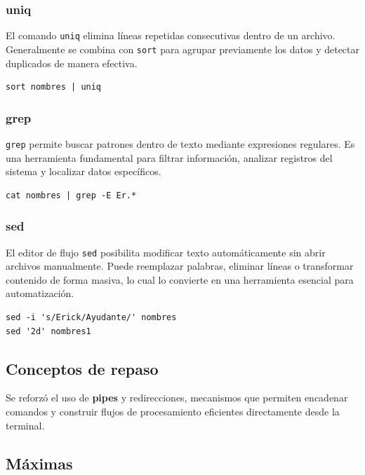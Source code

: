 \documentclass[11pt, letterpaper]{article}
\begin{document}
\subsubsection{uniq}
\label{sec:orge931486}

El comando \texttt{uniq} elimina líneas repetidas consecutivas dentro de un
archivo. Generalmente se combina con \texttt{sort} para agrupar previamente
los datos y detectar duplicados de manera efectiva.

\begin{verbatim}
sort nombres | uniq
\end{verbatim}
\subsubsection{grep}
\label{sec:orgb2d7c5a}

\texttt{grep} permite buscar patrones dentro de texto mediante expresiones
regulares. Es una herramienta fundamental para filtrar información,
analizar registros del sistema y localizar datos específicos.

\begin{verbatim}
cat nombres | grep -E Er.*
\end{verbatim}
\subsubsection{sed}
\label{sec:org9660952}

El editor de flujo \texttt{sed} posibilita modificar texto automáticamente sin
abrir archivos manualmente. Puede reemplazar palabras, eliminar líneas
o transformar contenido de forma masiva, lo cual lo convierte en una
herramienta esencial para automatización.

\begin{verbatim}
sed -i 's/Erick/Ayudante/' nombres
sed '2d' nombres1
\end{verbatim}
\subsection{Conceptos de repaso}
\label{sec:org37a0312}

Se reforzó el uso de \textbf{pipes} y redirecciones, mecanismos que permiten
encadenar comandos y construir flujos de procesamiento eficientes
directamente desde la terminal.
\subsection{Máximas}
\label{sec:orgc6ac54d}
\end{document}
